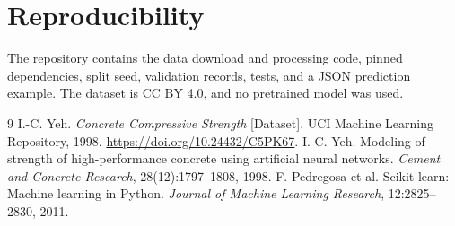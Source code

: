\documentclass[10pt,a4paper]{article}
\begin{document}
\section*{Reproducibility}
The repository contains the data download and processing code, pinned dependencies, split seed, validation records, tests, and a JSON prediction example. The dataset is CC BY 4.0, and no pretrained model was used.

\begin{thebibliography}{9}\small\setlength{\itemsep}{0pt}
 I.-C. Yeh. \emph{Concrete Compressive Strength} [Dataset]. UCI Machine Learning Repository, 1998. \url{https://doi.org/10.24432/C5PK67}.
 I.-C. Yeh. Modeling of strength of high-performance concrete using artificial neural networks. \emph{Cement and Concrete Research}, 28(12):1797--1808, 1998.
 F. Pedregosa et al. Scikit-learn: Machine learning in Python. \emph{Journal of Machine Learning Research}, 12:2825--2830, 2011.
\end{thebibliography}
\end{document}
